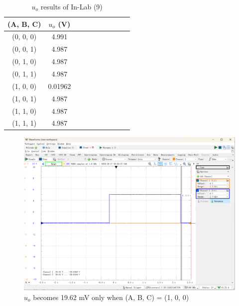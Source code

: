 \documentclass[UTF8]{report}
\theoremstyle{MyLineTheoremStyle} %
\theoremstyle{MyBlockTheoremStyle} %
\theoremstyle{MySubsubsectionStyle} %
\begin{document}
\begin{center}\noindent\begin{minipage}{0.37\columnwidth}
\begin{table}[H]\centering
    \caption{$u_o$ results of In-Lab (9)}
\begin{tabular}{cccccccccc}\toprule
        (A, B, C) & $u_o$ (V) \\
    \midrule
        (0, 0, 0) & 4.991 \\
        (0, 0, 1) & 4.987 \\
        (0, 1, 0) & 4.987 \\
        (0, 1, 1) & 4.987 \\
        (1, 0, 0) & {\color{red} 0.01962} \\
        (1, 0, 1) & 4.987 \\
        (1, 1, 0) & 4.987 \\
        (1, 1, 1) & 4.987 \\
    \bottomrule
\end{tabular}
\end{table}
\end{minipage}\hfill\begin{minipage}{0.6\columnwidth}
\begin{figure}[H]\centering
\includegraphics[width=\columnwidth]{assets/Lab1/0a4980b937130cf7da2712234599eb2a.png}
\caption{$u_o$ becomes 19.62 mV only when (A, B, C) = (1, 0, 0)}
\end{figure}
\end{minipage}\end{center}
\end{document}
